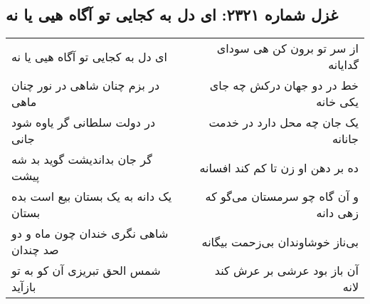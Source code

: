 \begin{center}
\section*{غزل شماره ۲۳۲۱: ای دل به کجایی تو آگاه هیی یا نه}
\label{sec:2321}
\begin{longtable}{l p{0.5cm} r}
ای دل به کجایی تو آگاه هیی یا نه
&&
از سر تو برون کن هی سودای گدایانه
\\
در بزم چنان شاهی در نور چنان ماهی
&&
خط در دو جهان درکش چه جای یکی خانه
\\
در دولت سلطانی گر یاوه شود جانی
&&
یک جان چه محل دارد در خدمت جانانه
\\
گر جان بداندیشت گوید بد شه پیشت
&&
ده بر دهن او زن تا کم کند افسانه
\\
یک دانه به یک بستان بیع است بده بستان
&&
و آن گاه چو سرمستان می‌گو که زهی دانه
\\
شاهی نگری خندان چون ماه و دو صد چندان
&&
بی‌ناز خوشاوندان بی‌زحمت بیگانه
\\
شمس الحق تبریزی آن کو به تو بازآید
&&
آن باز بود عرشی بر عرش کند لانه
\\
\end{longtable}
\end{center}
